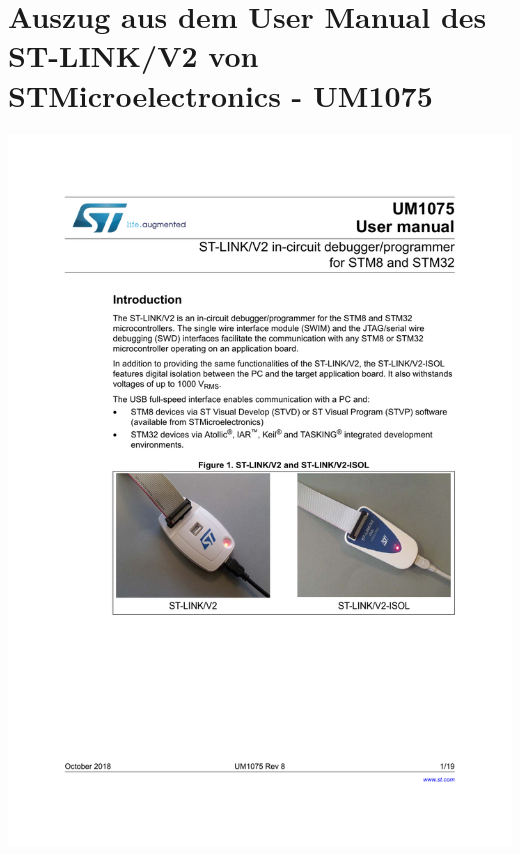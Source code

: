 \section{Auszug aus dem User Manual des ST-LINK/V2 von STMicroelectronics - UM1075}
\begin{center}
	\includegraphics[page=12,width=0.96\columnwidth]{./datenblaetter/ST_LINK_V2}
\end{center}
